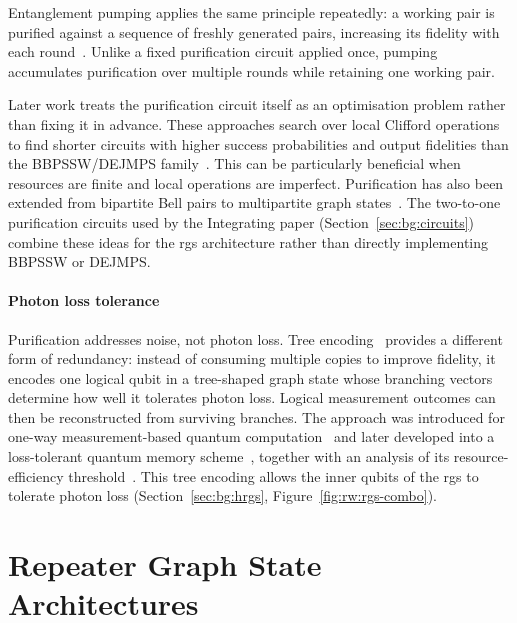 Entanglement pumping applies the same principle repeatedly: a working pair is purified against a sequence of freshly generated pairs, increasing its fidelity with each round~\cite{Dur1999Quantum,Deutsch1996Quantum,Bennett1996Purification}. Unlike a fixed purification circuit applied once, pumping accumulates purification over multiple rounds while retaining one working pair.

Later work treats the purification circuit itself as an optimisation problem rather than fixing it in advance. These approaches search over local Clifford operations to find shorter circuits with higher success probabilities and output fidelities than the BBPSSW/DEJMPS family~\cite{Krastanov2019Optimized}. This can be particularly beneficial when resources are finite and local operations are imperfect. Purification has also been extended from bipartite Bell pairs to multipartite graph states~\cite{Dur2003Multiparticle,Kruszynska2006Entanglement}. The two-to-one purification circuits used by the Integrating paper (Section~\ref{sec:bg:circuits}) combine these ideas for the \Gls{rgs} architecture rather than directly implementing BBPSSW or DEJMPS.

\paragraph{Photon loss tolerance}
\label{sec:rw:photonloss}

Purification addresses noise, not photon loss. Tree encoding~\cite{Varnava2006Loss} provides a different form of redundancy: instead of consuming multiple copies to improve fidelity, it encodes one logical qubit in a tree-shaped graph state whose branching vectors determine how well it tolerates photon loss. Logical measurement outcomes can then be reconstructed from surviving branches. The approach was introduced for one-way measurement-based quantum computation~\cite{Raussendorf2003Measurementbased,Raussendorf2002oneway,Varnava2006Loss} and later developed into a loss-tolerant quantum memory scheme~\cite{Varnava2007Loss}, together with an analysis of its resource-efficiency threshold~\cite{Varnava2008How}. This tree encoding allows the inner qubits of the \Gls{rgs} to tolerate photon loss (Section~\ref{sec:bg:hrgs}, Figure~\ref{fig:rw:rgs-combo}).

\section{Repeater Graph State Architectures}
\label{sec:rw:rgs}

